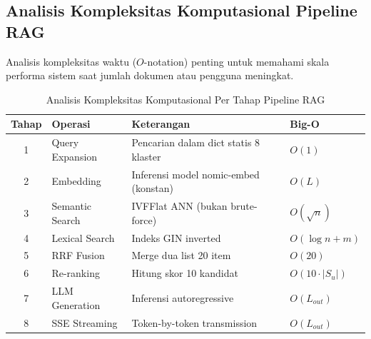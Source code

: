 \subsection{Analisis Kompleksitas Komputasional Pipeline RAG}
\label{subsec:kompleksitas}

Analisis kompleksitas waktu ($O$-notation) penting untuk memahami skala performa
sistem saat jumlah dokumen atau pengguna meningkat.

\begin{table}[H]
\centering
\caption{Analisis Kompleksitas Komputasional Per Tahap Pipeline RAG}
\label{tab:kompleksitas}
\begin{tabularx}{\textwidth}{clXl}
\toprule
\textbf{Tahap} & \textbf{Operasi} & \textbf{Keterangan} & \textbf{Big-O} \\
\midrule
1 & Query Expansion & Pencarian dalam dict statis 8 klaster & $O(1)$ \\
2 & Embedding & Inferensi model nomic-embed (konstan) & $O(L)$ \\
3 & Semantic Search & IVFFlat ANN (bukan brute-force) & $O(\sqrt{n})$ \\
4 & Lexical Search & Indeks GIN inverted & $O(\log n + m)$ \\
5 & RRF Fusion & Merge dua list 20 item & $O(20)$ \\
6 & Re-ranking & Hitung skor 10 kandidat & $O(10 \cdot |S_u|)$ \\
7 & LLM Generation & Inferensi autoregressive & $O(L_{out})$ \\
8 & SSE Streaming & Token-by-token transmission & $O(L_{out})$ \\
\bottomrule
\end{tabularx}
\end{table}


